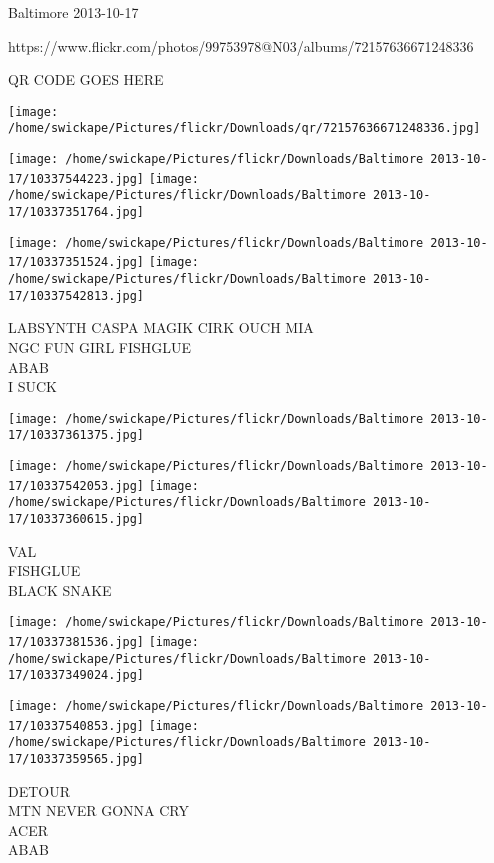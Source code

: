 \documentclass[10pt,letterpaper]{article}
\begin{document}
Baltimore 2013-10-17

https://www.flickr.com/photos/99753978@N03/albums/72157636671248336

QR CODE GOES HERE

\texttt{[image: /home/swickape/Pictures/flickr/Downloads/qr/72157636671248336.jpg]}
\pagebreak

\texttt{[image: /home/swickape/Pictures/flickr/Downloads/Baltimore 2013-10-17/10337544223.jpg]}
\texttt{[image: /home/swickape/Pictures/flickr/Downloads/Baltimore 2013-10-17/10337351764.jpg]}

\texttt{[image: /home/swickape/Pictures/flickr/Downloads/Baltimore 2013-10-17/10337351524.jpg]}
\texttt{[image: /home/swickape/Pictures/flickr/Downloads/Baltimore 2013-10-17/10337542813.jpg]}

LABSYNTH CASPA MAGIK CIRK OUCH MIA\\
NGC FUN GIRL FISHGLUE\\
ABAB\\
I SUCK\\
\pagebreak

\texttt{[image: /home/swickape/Pictures/flickr/Downloads/Baltimore 2013-10-17/10337361375.jpg]}

\vspace{0.25in}
\texttt{[image: /home/swickape/Pictures/flickr/Downloads/Baltimore 2013-10-17/10337542053.jpg]}
\texttt{[image: /home/swickape/Pictures/flickr/Downloads/Baltimore 2013-10-17/10337360615.jpg]}

VAL\\
FISHGLUE\\
BLACK SNAKE\\
\pagebreak

\texttt{[image: /home/swickape/Pictures/flickr/Downloads/Baltimore 2013-10-17/10337381536.jpg]}
\texttt{[image: /home/swickape/Pictures/flickr/Downloads/Baltimore 2013-10-17/10337349024.jpg]}

\texttt{[image: /home/swickape/Pictures/flickr/Downloads/Baltimore 2013-10-17/10337540853.jpg]}
\texttt{[image: /home/swickape/Pictures/flickr/Downloads/Baltimore 2013-10-17/10337359565.jpg]}

DETOUR\\
MTN NEVER GONNA CRY\\
ACER\\
ABAB\\
\pagebreak
\end{document}
